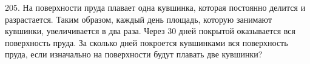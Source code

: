 205. На поверхности пруда плавает одна кувшинка, которая постоянно делится и разрастается. Таким образом, каждый день площадь, которую занимают кувшинки, увеличивается в два раза. Через 30 дней покрытой оказывается вся поверхность пруда. За сколько дней покроется кувшинками вся поверхность пруда, если изначально на поверхности будут плавать две кувшинки?\\
